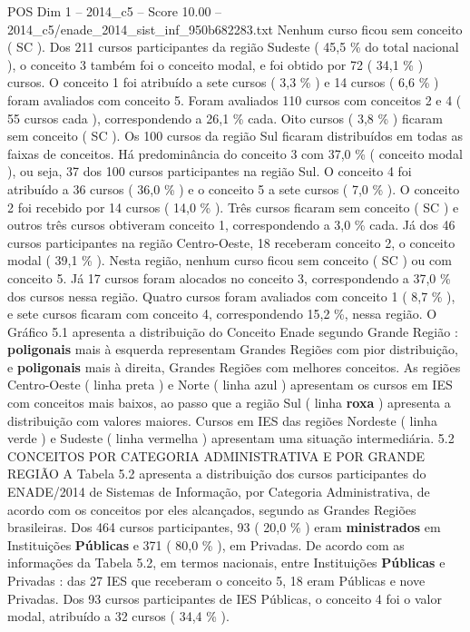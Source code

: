 \begin{textsample}{POS Dim 1 – 2014\_c5 – Score 10.00 – 2014\_c5/enade\_2014\_sist\_inf\_950b682283.txt}
Nenhum curso ficou sem conceito ( SC ).
Dos 211 cursos participantes da região Sudeste ( 45,5 \% do total nacional ), o conceito 3 também foi o conceito modal, e foi obtido por 72 ( 34,1 \% ) cursos.
O conceito 1 foi atribuído a sete cursos ( 3,3 \% ) e 14 cursos ( 6,6 \% ) foram avaliados com conceito 5.
Foram avaliados 110 cursos com conceitos 2 e 4 ( 55 cursos cada ), correspondendo a 26,1 \% cada.
Oito cursos ( 3,8 \% ) ficaram sem conceito ( SC ).
Os 100 cursos da região Sul ficaram distribuídos em todas as faixas de conceitos.
Há predominância do conceito 3 com 37,0 \% ( conceito modal ), ou seja, 37 dos 100 cursos participantes na região Sul.
O conceito 4 foi atribuído a 36 cursos ( 36,0 \% ) e o conceito 5 a sete cursos ( 7,0 \% ).
O conceito 2 foi recebido por 14 cursos ( 14,0 \% ).
Três cursos ficaram sem conceito ( SC ) e outros três cursos obtiveram conceito 1, correspondendo a 3,0 \% cada.
Já dos 46 cursos participantes na região Centro-Oeste, 18 receberam conceito 2, o conceito modal ( 39,1 \% ).
Nesta região, nenhum curso ficou sem conceito ( SC ) ou com conceito 5.
Já 17 cursos foram alocados no conceito 3, correspondendo a 37,0 \% dos cursos nessa região.
Quatro cursos foram avaliados com conceito 1 ( 8,7 \% ), e sete cursos ficaram com conceito 4, correspondendo 15,2 \%, nessa região.
O Gráfico 5.1 apresenta a distribuição do Conceito Enade segundo Grande Região : \textbf{poligonais} mais à esquerda representam Grandes Regiões com pior distribuição, e \textbf{poligonais} mais à direita, Grandes Regiões com melhores conceitos.
As regiões Centro-Oeste ( linha preta ) e Norte ( linha azul ) apresentam os cursos em IES com conceitos mais baixos, ao passo que a região Sul ( linha \textbf{roxa} ) apresenta a distribuição com valores maiores.
Cursos em IES das regiões Nordeste ( linha verde ) e Sudeste ( linha vermelha ) apresentam uma situação intermediária. 5.2 CONCEITOS POR CATEGORIA ADMINISTRATIVA E POR GRANDE REGIÃO A Tabela 5.2 apresenta a distribuição dos cursos participantes do ENADE/2014 de Sistemas de Informação, por Categoria Administrativa, de acordo com os conceitos por eles alcançados, segundo as Grandes Regiões brasileiras.
Dos 464 cursos participantes, 93 ( 20,0 \% ) eram \textbf{ministrados} em Instituições \textbf{Públicas} e 371 ( 80,0 \% ), em Privadas.
De acordo com as informações da Tabela 5.2, em termos nacionais, entre Instituições \textbf{Públicas} e Privadas : das 27 IES que receberam o conceito 5, 18 eram Públicas e nove Privadas.
Dos 93 cursos participantes de IES Públicas, o conceito 4 foi o valor modal, atribuído a 32 cursos ( 34,4 \% ).

\end{textsample}
